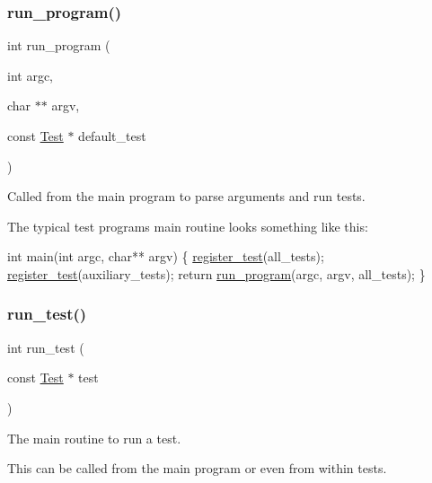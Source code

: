 \subsubsection{\texorpdfstring{run\+\_\+program()}{run\_program()}}
{\footnotesize\ttfamily int run\+\_\+program (\begin{DoxyParamCaption}\item[{int}]{argc,  }\item[{char $\ast$$\ast$}]{argv,  }\item[{const \hyperlink{structTest}{Test} $\ast$}]{default\+\_\+test }\end{DoxyParamCaption})}



Called from the main program to parse arguments and run tests. 

The typical test program\textquotesingle{}s main routine looks something like this\+: 
\begin{DoxyCode}
\textcolor{keywordtype}{int} main(\textcolor{keywordtype}{int} argc, \textcolor{keywordtype}{char}** argv) \{
    \hyperlink{group__Testing_ga4663cf3fb390b2a6d9cf1943f21b9934}{register\_test}(all\_tests);
    \hyperlink{group__Testing_ga4663cf3fb390b2a6d9cf1943f21b9934}{register\_test}(auxiliary\_tests);
    \textcolor{keywordflow}{return} \hyperlink{group__Testing_ga91dbdb97056588b088b689582abc2382}{run\_program}(argc, argv, all\_tests);
\}
\end{DoxyCode}
 \mbox{\label{group__Testing_gac023795199b4f577a9181ac45e62b170}} 
\subsubsection{\texorpdfstring{run\+\_\+test()}{run\_test()}}
{\footnotesize\ttfamily int run\+\_\+test (\begin{DoxyParamCaption}\item[{const \hyperlink{structTest}{Test} $\ast$}]{test }\end{DoxyParamCaption})}



The main routine to run a test. 

This can be called from the main program or even from within tests. \mbox{\label{group__Testing_ga0f97d30c4cd1370bcac6d7f4775d6789}} 
